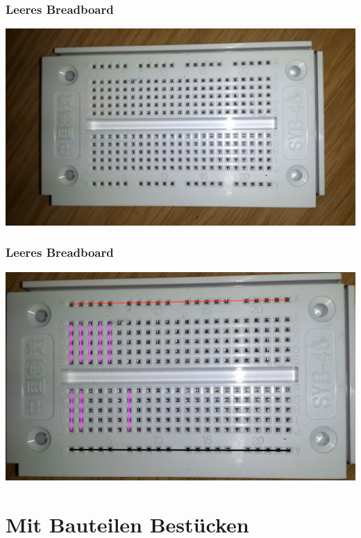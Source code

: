 \begin{frame}
    \frametitle{Leeres Breadboard}
	
	\begin{center}
        \includegraphics[width=1\textwidth]{e99/Leeres_Board.jpg}
    \end{center}
\end{frame}
    
\begin{frame}
    \frametitle{Leeres Breadboard}
	\begin{center}
        \includegraphics[width=1\textwidth]{e99/Leeres_Board_verbindungen.jpg}
    \end{center}
\end{frame}

\section*{Mit Bauteilen Bestücken}


